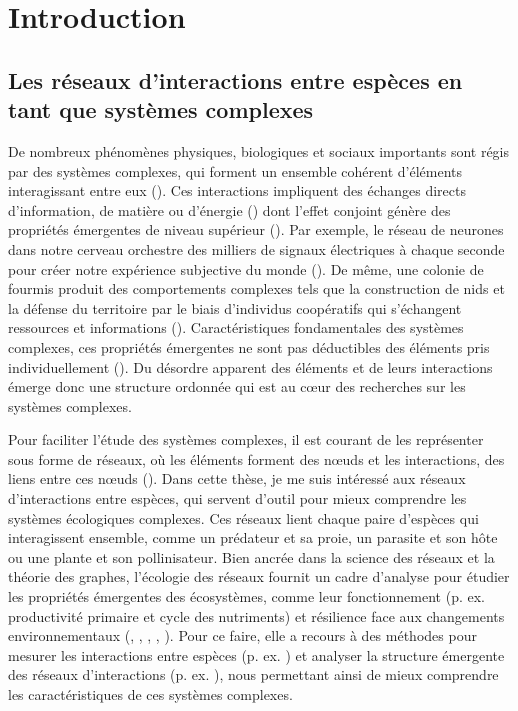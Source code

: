 
\francais   
\doublespacing

\chapter{Introduction}


\section{Les réseaux d'interactions entre espèces en tant que systèmes complexes}

De nombreux phénomènes physiques, biologiques et sociaux importants sont régis
par des systèmes complexes, qui forment un ensemble cohérent d'éléments
interagissant entre eux (\cite{Rind1999Complexity}). Ces interactions impliquent
des échanges directs d'information, de matière ou d'énergie
(\cite{Ladyman2013What}) dont l'effet conjoint génère des propriétés émergentes
de niveau supérieur (\cite{Foote2007Mathematics}). Par exemple, le réseau de
neurones dans notre cerveau orchestre des milliers de signaux électriques à
chaque seconde pour créer notre expérience subjective du monde
(\cite{Sporns2011Human}). De même, une colonie de fourmis produit des
comportements complexes tels que la construction de nids et la défense du
territoire par le biais d'individus coopératifs qui s'échangent ressources et
informations (\cite{Bonabeau1999Swarm}). Caractéristiques fondamentales des
systèmes complexes, ces propriétés émergentes ne sont pas déductibles des
éléments pris individuellement (\cite{Nielsen2000Emergent}). Du désordre
apparent des éléments et de leurs interactions émerge donc une structure
ordonnée qui est au cœur des recherches sur les systèmes complexes.  

Pour faciliter l'étude des systèmes complexes, il est courant de les représenter
sous forme de réseaux, où les éléments forment des nœuds et les interactions,
des liens entre ces nœuds (\cite{Newman2003Structure}). Dans cette thèse, je me
suis intéressé aux réseaux d'interactions entre espèces, qui servent d'outil
pour mieux comprendre les systèmes écologiques complexes. Ces réseaux lient
chaque paire d'espèces qui interagissent ensemble, comme un prédateur et sa
proie, un parasite et son hôte ou une plante et son pollinisateur. Bien ancrée
dans la science des réseaux et la théorie des graphes, l'écologie des réseaux
fournit un cadre d'analyse pour étudier les propriétés émergentes des
écosystèmes, comme leur fonctionnement (p. ex. productivité primaire et cycle
des nutriments) et résilience face aux changements environnementaux
(\cite{Proulx2005Network}, \cite{McCann2007Protecting}, \cite{McCann2011Food},
\cite{Rooney2012Integrating}, \cite{Valiente-Banuet2019Species}). Pour ce faire,
elle a recours à des méthodes pour mesurer les interactions entre espèces (p.
ex. \cite{Jordano2016Sampling}) et analyser la structure émergente des réseaux
d'interactions (p. ex. \cite{Delmas2019Analysing}), nous permettant ainsi de
mieux comprendre les caractéristiques de ces systèmes complexes. 

